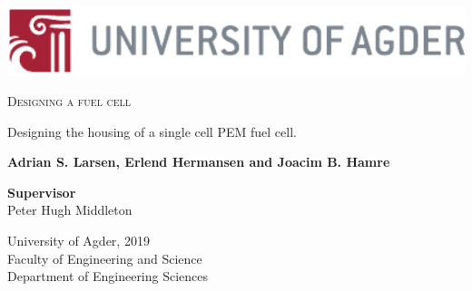 
\begin{titlepage}

\begin{center}
\includegraphics[width=140mm]{DIV./Pics/uia-logo.pdf}

\vspace{1cm}

{\LARGE
\textsc{Designing a fuel cell}}\\

\vspace{0.5cm}

Designing the housing of a single cell PEM fuel cell.

\vspace{4.5cm}

{\bf{Adrian S. Larsen, Erlend Hermansen and Joacim B. Hamre}}

\vspace{4cm}

{\bf{Supervisor}} \\
Peter Hugh Middleton

\vspace{5cm}


\vspace{2cm}

University of Agder, 2019 \\
Faculty of Engineering and Science \\
Department of Engineering Sciences

\end{center}
\end{titlepage}
